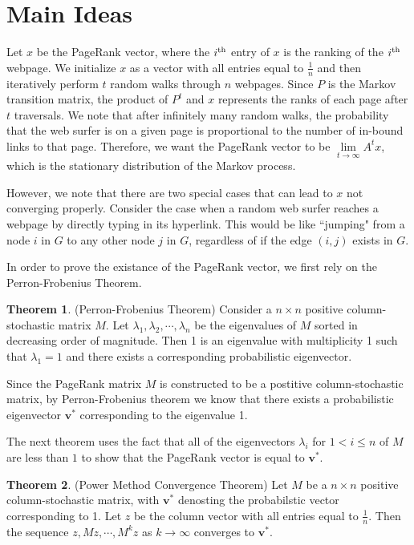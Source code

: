 \documentclass[11pt]{article}
\theoremstyle{definition}
\newtheorem{theorem}{Theorem}
\renewcommand{\vec}[1]{\mathbf{#1}}
\begin{document}
\section{Main Ideas}
Let $x$ be the PageRank vector, where the $i^{\textnormal{th}}$ entry of $x$ is the ranking of the $i^{\textnormal{th}}$ webpage.
We initialize $x$ as a vector with all entries equal to $\frac{1}{n}$ and then iteratively perform $t$ random walks through $n$ webpages.
Since $P$ is the Markov transition matrix, the product of $P^t$ and $x$ represents the ranks of each page after $t$ traversals.
We note that after infinitely many random walks, the probability that the web surfer is on a given page is proportional to the number of in-bound links to that page.
Therefore, we want the PageRank vector to be $\lim\limits_{t\to \infty}{A^tx}$, which is the stationary distribution of the Markov process.

However, we note that there are two special cases that can lead to $x$ not converging properly.
Consider the case when a random web surfer reaches a webpage by directly typing in its hyperlink. This would be like ``jumping" from a node $i$ in $G$ to any other node $j$ in $G$, regardless of if the edge $(i,j)$ exists in $G$.

In order to prove the existance of the PageRank vector, we first rely on the Perron-Frobenius Theorem.
\begin{theorem}
    (Perron-Frobenius Theorem) Consider a $n\times n$ positive column-stochastic matrix $M$. Let $\lambda_1, \lambda_2, \cdots, \lambda_n$ be the eigenvalues of $M$ sorted in decreasing order of magnitude. Then 1 is an eigenvalue with multiplicity 1 such that $\lambda_1=1$ and there exists a corresponding probabilistic eigenvector.
\end{theorem}

Since the PageRank matrix $M$ is constructed to be a postitive column-stochastic matrix, by Perron-Frobenius theorem we know that there exists a probabilistic eigenvector $\vec{v}^*$ corresponding to the eigenvalue 1.

The next theorem uses the fact that all of the eigenvectors $\lambda_i$ for $1<i\leq n$ of $M$ are less than $1$ to show that the PageRank vector is equal to $\vec{v}^*$.
\begin{theorem}
    (Power Method Convergence Theorem) Let $M$ be a $n\times n$ positive column-stochastic matrix, with $\vec{v}^*$ denosting the probabilstic vector corresponding to 1. Let $z$ be the column vector with all entries equal to $\frac{1}{n}$. Then the sequence $z, Mz, \cdots, M^kz$ as $k\to \infty$ converges to $\vec{v}^*$.    
\end{theorem}
\end{document}
